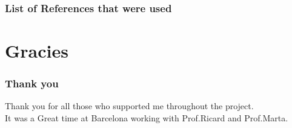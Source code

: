\documentclass{beamer}
\begin{document}
\frame
{
	\frametitle{List of References that were used}


{}
}
\section{Gracies}

\frame
{
	\frametitle{Thank you}
Thank you for all those who supported me throughout the project.\\
It was a Great time at Barcelona working with Prof.Ricard and Prof.Marta.

{}
}
\end{document}
